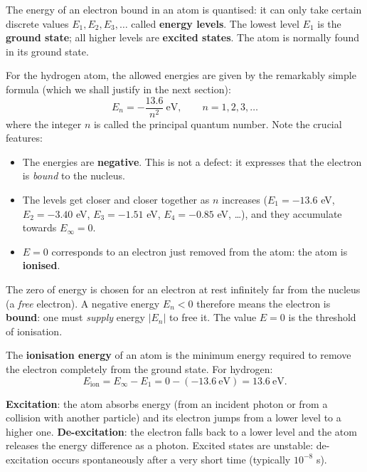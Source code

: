 \documentclass[11pt]{article}
\newcommand{\cle}[1]{{\popxbold\color{popdark}#1}}
\begin{document}
\begin{definition}
The energy of an electron bound in an atom is \cle{quantised}: it can only take certain discrete values $E_1, E_2, E_3, \dots$ called \textbf{energy levels}. The lowest level $E_1$ is the \textbf{ground state}; all higher levels are \textbf{excited states}. The atom is normally found in its ground state.
\end{definition}

For the hydrogen atom, the allowed energies are given by the remarkably simple formula (which we shall justify in the next section):
\[
E_n = -\frac{13.6}{n^2}\ \text{eV}, \qquad n = 1, 2, 3, \dots
\]
where the integer $n$ is called the \cle{principal quantum number}. Note the crucial features:

\begin{itemize}
\item The energies are \textbf{negative}. This is not a defect: it expresses that the electron is \emph{bound} to the nucleus.
\item The levels get closer and closer together as $n$ increases ($E_1 = -13.6$ eV, $E_2 = -3.40$ eV, $E_3 = -1.51$ eV, $E_4 = -0.85$ eV, \dots), and they accumulate towards $E_\infty = 0$.
\item $E = 0$ corresponds to an electron just removed from the atom: the atom is \textbf{ionised}.
\end{itemize}

\begin{propriete}
The zero of energy is chosen for an electron at rest infinitely far from the nucleus (a \emph{free} electron). A negative energy $E_n < 0$ therefore means the electron is \textbf{bound}: one must \emph{supply} energy $|E_n|$ to free it. The value $E = 0$ is the threshold of \cle{ionisation}.
\end{propriete}

\begin{definition}
The \textbf{ionisation energy} of an atom is the minimum energy required to remove the electron completely from the ground state. For hydrogen:
\[
E_{\text{ion}} = E_\infty - E_1 = 0 - (-13.6\ \text{eV}) = 13.6\ \text{eV}.
\]
\end{definition}

\begin{definition}
\textbf{Excitation}: the atom absorbs energy (from an incident photon or from a collision with another particle) and its electron jumps from a lower level to a higher one. \textbf{De-excitation}: the electron falls back to a lower level and the atom releases the energy difference as a photon. Excited states are unstable: de-excitation occurs spontaneously after a very short time (typically $10^{-8}$ s).
\end{definition}
\end{document}
